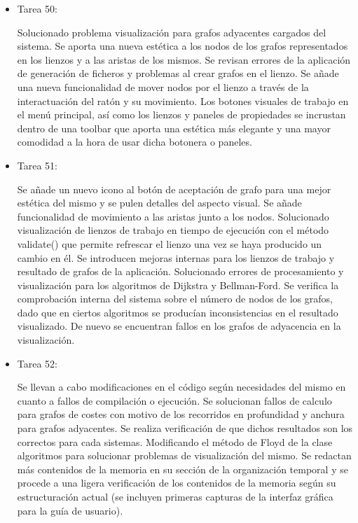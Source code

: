 \begin{itemize}
\item Tarea 50:

Solucionado problema visualización para grafos adyacentes cargados del sistema. Se aporta una nueva estética a los nodos de los grafos representados en los lienzos y a las aristas de los mismos. Se revisan errores de la aplicación de generación de ficheros y problemas al crear grafos en el lienzo. Se añade una nueva funcionalidad de mover nodos por el lienzo a través de la interactuación del ratón y su movimiento. Los botones visuales de trabajo en el menú principal, así como los lienzos y paneles de propiedades se incrustan dentro de una toolbar que aporta una estética más elegante y una mayor comodidad a la hora de usar dicha botonera o paneles.\\

\item Tarea 51:

Se añade un nuevo icono al botón de aceptación de grafo para una mejor estética del mismo y se pulen detalles del aspecto visual. Se añade funcionalidad de movimiento a las aristas junto a los nodos. Solucionado visualización de lienzos de trabajo en tiempo de ejecución con el método validate() que permite refrescar el lienzo una vez se haya producido un cambio en él. Se introducen mejoras internas para los lienzos de trabajo y resultado de grafos de la aplicación. Solucionado errores de procesamiento y visualización para los algoritmos de Dijkstra y Bellman-Ford. Se verifica la comprobación interna del sistema sobre el número de nodos de los grafos, dado que en ciertos algoritmos se producían inconsistencias en el resultado visualizado. De nuevo se encuentran fallos en los grafos de adyacencia en la visualización.\\

\item Tarea 52:

Se llevan a cabo modificaciones en el código según necesidades del mismo en cuanto a fallos de compilación o ejecución. Se solucionan fallos de calculo para grafos de costes con motivo de los recorridos en profundidad y anchura para grafos adyacentes. Se realiza verificación de que dichos resultados son los correctos para cada sistemas. Modificando el método de Floyd de la clase algoritmos para solucionar problemas de visualización del mismo. Se redactan más contenidos de la memoria en su sección de la organización temporal y se procede a una ligera verificación de los contenidos de la memoria según su estructuración actual (se incluyen primeras capturas de la interfaz gráfica para la guía de usuario). \\


\end{itemize}
